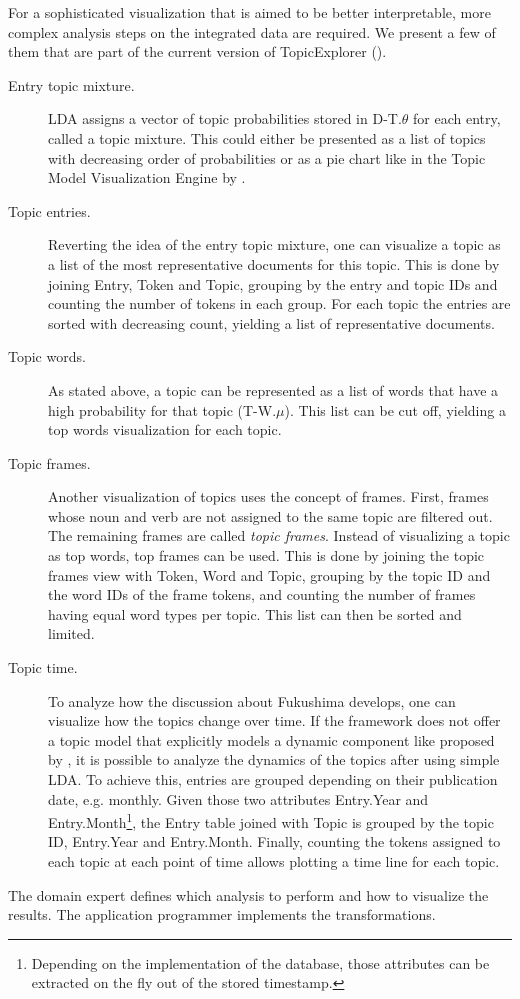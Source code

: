 For a sophisticated visualization that is aimed to be better interpretable, more complex analysis steps on the integrated data are required. We present a few of them that are part of the current version of TopicExplorer (\cite{hinneburg2014topic}).

\begin{description}
\item[Entry topic mixture.] LDA assigns a vector of topic probabilities stored in D-T.$\theta$ for each entry, called a topic mixture. This could either be presented as a list of topics with decreasing order of probabilities or as a pie chart like in the Topic Model Visualization Engine by \textcite{chaney2012visualizing}.

\item[Topic entries.] Reverting the idea of the entry topic mixture, one can visualize a topic as a list of the most representative documents for this topic. This is done by joining Entry, Token and Topic, grouping by the entry and topic IDs and counting the number of tokens in each group. For each topic the entries are sorted with decreasing count, yielding a list of representative documents.

\item[Topic words.] As stated above, a topic can be represented as a list of words that have a high probability for that topic (T-W.$\mu$). This list can be cut off, yielding a top words visualization for each topic.

\item[Topic frames.] Another visualization of topics uses the concept of frames. First, frames whose noun and verb are not assigned to the same topic are filtered out. The remaining frames are called \emph{topic frames}. Instead of visualizing a topic as top words, top frames can be used. This is done by joining the topic frames view with Token, Word and Topic, grouping by the topic ID and the word IDs of the frame tokens, and counting the number of frames having equal word types per topic. This list can then be sorted and limited.

\item[Topic time.] To analyze how the discussion about Fukushima develops, one can visualize how the topics change over time. If the framework does not offer a topic model that explicitly models a dynamic component like proposed by \textcite{blei2006dynamic}, it is possible to analyze the dynamics of the topics after using simple LDA. To achieve this, entries are grouped depending on their publication date, e.g. monthly. Given those two attributes Entry.Year and Entry.Month\footnote{Depending on the implementation of the database, those attributes can be extracted on the fly out of the stored timestamp.}, the Entry table joined with Topic is grouped by the topic ID, Entry.Year and Entry.Month. Finally, counting the tokens assigned to each topic at each point of time allows plotting a time line for each topic.
\end{description}

The domain expert defines which analysis to perform and how to visualize the results. The application programmer implements the transformations.
